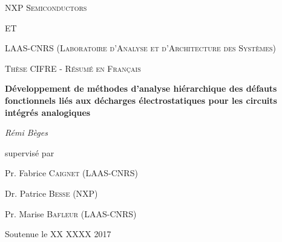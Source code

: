 \documentclass[11pt,a4paper]{book}
\title{}
\author{ \\ }
\date{Résumé en français}
\begin{document}
\begin{titlepage}
	\centering
	{\scshape NXP Semiconductors \par}
	\vspace{0.5cm}
  {\scshape ET \par}
	\vspace{0.5cm}
  {\scshape LAAS-CNRS (Laboratoire d'Analyse et d'Architecture des Systèmes) \par}
  \vspace{1cm}
	{\scshape\Large Thèse CIFRE - Résumé en Français\par}
	\vspace{1.5cm}
	{\huge\bfseries Développement de méthodes d'analyse hiérarchique des défauts fonctionnels liés aux décharges électrostatiques pour les circuits intégrés analogiques\par}
	\vspace{2cm}
	{\Large\itshape Rémi Bèges\par}
	\vfill
	supervisé par\par
	Pr. Fabrice \textsc{Caignet} (LAAS-CNRS)\par
  Dr. Patrice \textsc{Besse} (NXP)\par
  Pr. Marise \textsc{Bafleur} (LAAS-CNRS)\par

	\vfill

	{\large Soutenue le XX XXXX 2017\par}
\end{titlepage}








\tableofcontents



\printindex
\printglossary
\end{document}

